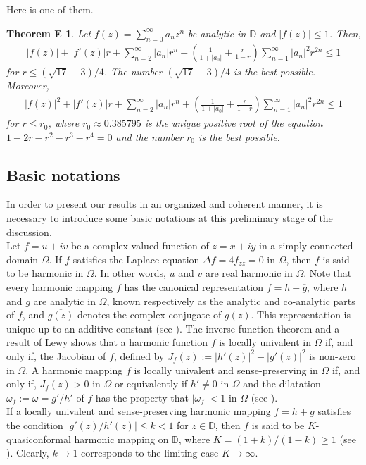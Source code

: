 \documentclass[11pt,reqno]{amsart}
\newtheorem*{theoE}{Theorem E}
\newtheorem{open problem}{Open problem}[section]
\newcommand{\ol}{\overline}
\newcommand{\beas}{\begin{eqnarray*}}
\newcommand{\eeas}{\end{eqnarray*}}
\numberwithin{equation}{section}
\begin{document}
Here is one of them.
\begin{theoE}\cite{LLP2021} Let $f(z)=\sum_{n=0}^{\infty} a_nz^n$ be analytic in $\mathbb{D}$ and $|f(z)|\leq 1$. Then,
\beas |f(z)|+|f'(z)|r+\sum_{n=2}^\infty |a_n| r^n+\left(\frac{1}{1+|a_0|}+\frac{r}{1- r}\right)\sum_{n=1}^\infty |a_n|^2  r^{2n}\leq 1\eeas
for $r\leq (\sqrt{17}-3)/4$. The number $(\sqrt{17}-3)/4$ is the best possible. Moreover, 
\beas |f(z)|^2+|f'(z)|r+\sum_{n=2}^\infty |a_n| r^n+\left(\frac{1}{1+|a_0|}+\frac{r}{1- r}\right)\sum_{n=1}^\infty |a_n|^2  r^{2n}\leq 1\eeas
for $r\leq r_0$, where $r_0\approx 0.385795$ is the unique positive root of the equation $1-2r-r^2-r^3-r^4=0$ and the number $r_0$ is the best possible. 
\end{theoE}
\subsection{Basic notations}
In order to present our results in an organized and coherent manner, it is necessary to introduce some basic notations at this preliminary stage of the discussion.\\[2mm]
 Let $f = u + iv$ be a complex-valued function of $z=x+i y$ in a simply connected domain $\Omega$. If $f$ satisfies the Laplace equation $\Delta f =4f_{z\ol z} = 0$  in $\Omega$, then $f$ is said to be harmonic in $\Omega$. In other words, $u$ and $v$ are real harmonic in $\Omega$. Note that every harmonic mapping $f$ has the canonical representation $f = h + \ol g$, where $h$ and 
$g$ are analytic in $\Omega$, known respectively as the analytic and co-analytic parts of $f$, and $\ol{g(z)}$ denotes the complex conjugate of $g(z)$. This representation is 
unique up to an additive constant (see \cite{D2004}). The inverse function theorem and a result of Lewy \cite{L1936} shows that a harmonic function $f$ is locally univalent in 
$\Omega$ if, and only if, the Jacobian  of $f$, defined by $J_f(z):=|h'(z)|^2-|g'(z)|^2$ is non-zero in $\Omega$. A harmonic mapping $f$ is locally univalent and sense-preserving
in $\Omega$ if, and only if, $J_f (z) > 0$ in $\Omega$ or equivalently if $h'\not=0$ in $\Omega$
and the dilatation $\omega_f:= \omega=g'/h'$ of $f$ has the property that $|\omega_f| < 1$ in $\Omega$ (see \cite{L1936}).\\[2mm]
\indent If a locally univalent and sense-preserving harmonic mapping $f = h+\ol{g}$ satisfies the condition $|g'(z)/h'(z)| \leq k < 1$ for $z\in\mathbb{D}$, then $f$ is said to be 
$K$-quasiconformal harmonic mapping on $\mathbb{D}$, where $K = (1+k)/(1-k) \geq 1$ (see \cite{K2008,M1968}). Clearly, $ k \to 1$ corresponds to the limiting case $K \to\infty$.\\[2mm]
\end{document}

